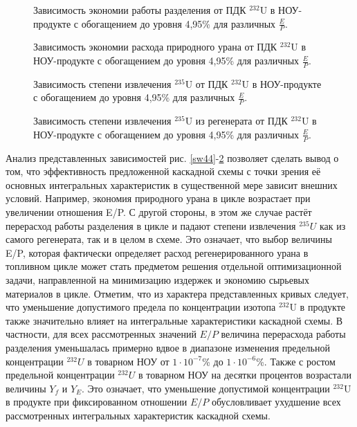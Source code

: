 \begin{figure}[ht]
    \centering
    \begin{minipage}{.5\textwidth}
      \centering
      
\caption{{Зависимость экономии работы разделения от ПДК $^{232}$U в НОУ-продукте с обогащением до уровня 4,95\% для различных $\frac{E}{P}$.{\label{sw495}}}}
    \end{minipage}%
    \begin{minipage}{.5\textwidth}
      \centering
      
    \caption{{Зависимость экономии расхода природного урана от ПДК $^{232}$U в НОУ-продукте с обогащением до уровня 4,95\% для различных $\frac{E}{P}$.{\label{F0R495}}}}
\end{minipage}
\end{figure}


\begin{figure}[ht]
    \centering
    \begin{minipage}{.5\textwidth}
      \centering
      
      \caption{{Зависимость степени извлечения $^{235}$U от ПДК $^{232}$U в НОУ-продукте с обогащением до уровня 4,95\% для различных $\frac{E}{P}$.{\label{ex495}}}}
    \end{minipage}%
    \begin{minipage}{.5\textwidth}
      \centering
      
      \caption{{Зависимость степени извлечения $^{235}$U из регенерата от ПДК $^{232}$U в НОУ-продукте с обогащением до уровня 4,95\% для различных $\frac{E}{P}$.{\label{exR495}}}}
\end{minipage}
\end{figure}


Анализ представленных зависимостей рис. \ref{sw44}-\ref{exR495} позволяет сделать вывод о том, что эффективность предложенной каскадной схемы с точки зрения её основных интегральных характеристик в существенной мере зависит внешних условий. Например, экономия природного урана в цикле возрастает при увеличении отношения E/P. С другой стороны, в этом же случае растёт перерасход работы разделения в цикле и падают степени извлечения $^{235}U$ как из самого регенерата, так и в целом в схеме. Это означает, что выбор величины E/P, которая фактически определяет расход регенерированного урана в топливном цикле может стать предметом решения отдельной оптимизационной задачи, направленной на минимизацию издержек и экономию сырьевых материалов в цикле. 
Отметим, что из характера представленных кривых следует, что уменьшение допустимого предела по концентрации изотопа $^{232}$U в продукте также значительно влияет на интегральные характеристики каскадной схемы. В частности, для всех рассмотренных значений $E/P$ величина перерасхода работы разделения уменьшалась примерно вдвое в диапазоне изменения предельной концентрации $^{232}U$ в товарном НОУ от $1\cdot10^{-7}$\% до $1\cdot10^{-6}$\%. Также с ростом предельной концентрации $^{232}U$ в товарном НОУ на десятки процентов возрастали величины $Y_f$ и $Y_{E}$. Это означает, что уменьшение допустимой концентрации $^{232}$U в продукте при фиксированном отношении $E/P$ обусловливает ухудшение всех рассмотренных интегральных характеристик каскадной схемы. 

